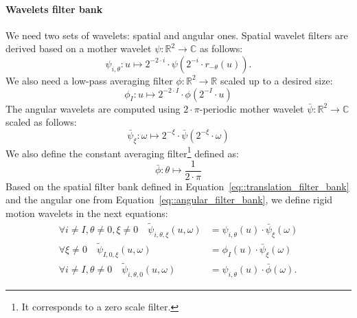             \paragraph{Wavelets filter bank}
                We need two sets of wavelets: spatial and angular ones.
                Spatial wavelet filters are derived based on a mother wavelet $\psi: \mathbb{R}^2 \rightarrow \mathbb{C}$ as follows:
                \begin{equation}
                    \label{eq::translation_filter_bank}
                    \psi_{i,\theta} : u\mapsto 2^{-2\cdot i}\cdot\psi\left(2^{-i}\cdot r_{-\theta}(u)\right).
                \end{equation}
                We also need a low-pass averaging filter $\phi: \mathbb{R}^2 \rightarrow \mathbb{R}$ scaled up to a desired size:
                \begin{equation}
                    \label{eq::translation_low_pass}
                    \phi_I: u\mapsto 2^{-2\cdot I}\cdot\phi\left(2^{-I}\cdot u\right)
                \end{equation}
                The angular wavelets are computed using $2\cdot\pi$-periodic mother wavelet $\bar\psi: \mathbb{R}^2 \rightarrow \mathbb{C}$ scaled as follows:
                \begin{equation}
                    \label{eq::angular_filter_bank}
                    \bar\psi_{\xi}: \omega \mapsto 2^{-\xi}\cdot\bar\psi\left(2^{-\xi}\cdot \omega\right)
                \end{equation}
                We also define the constant averaging filter\footnote{It corresponds to a zero scale filter.} defined as:
                \begin{equation}
                    \label{eq::angular_low_pass}
                    \bar\phi: \theta \mapsto \frac{1}{2\cdot\pi}
                \end{equation}
                Based on the spatial filter bank defined in Equation~\ref{eq::translation_filter_bank} and the angular one from Equation~\ref{eq::angular_filter_bank}, we define rigid motion wavelets in the next equations:
                \begin{align}
                    \label{eq::roto-translation_filter_bank}
                    \forall i\neq I, \theta \neq 0, \xi \neq 0 \quad \tilde{\psi}_{i, \theta, \xi}(u, \omega) &= \psi_{i,\theta}(u) \cdot \bar\psi_{\xi}(\omega)\\
                    \forall \xi \neq 0 \quad \tilde{\psi}_{I, 0, \xi}(u, \omega) &= \phi_I(u) \cdot \bar\psi_{\xi}(\omega)\\
                    \forall i\neq I, \theta \neq 0 \quad \tilde{\psi}_{i, \theta, 0}(u, \omega) &= \psi_{i,\theta}(u) \cdot \bar\phi(\omega).
                \end{align}
